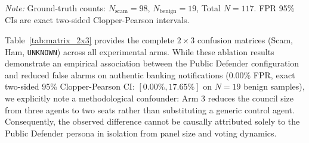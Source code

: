 \documentclass[journal]{IEEEtran}
\begin{document}
\begin{table}[t]
\centering
\caption{Comprehensive $2 \times 3$ Confusion Matrices and Verdict Accounting Across Council Configurations ($N=117$ Hard Challenge Suite)}
\label{tab:matrix_2x3}
\vspace{1ex}
\parbox{\columnwidth}{\footnotesize \textit{Note:} Ground-truth counts: $N_{\text{scam}} = 98$, $N_{\text{benign}} = 19$, Total $N=117$. FPR 95\% CIs are exact two-sided Clopper-Pearson intervals.}
\end{table}

Table~\ref{tab:matrix_2x3} provides the complete $2 \times 3$ confusion matrices (Scam, Ham, \texttt{UNKNOWN}) across all experimental arms. While these ablation results demonstrate an empirical association between the Public Defender configuration and reduced false alarms on authentic banking notifications ($0.00\%$ FPR, exact two-sided 95\% Clopper-Pearson CI: $[0.00\%, 17.65\%]$ on $N=19$ benign samples), we explicitly note a methodological confounder: Arm 3 reduces the council size from three agents to two seats rather than substituting a generic control agent. Consequently, the observed difference cannot be causally attributed solely to the Public Defender persona in isolation from panel size and voting dynamics.
\end{document}
